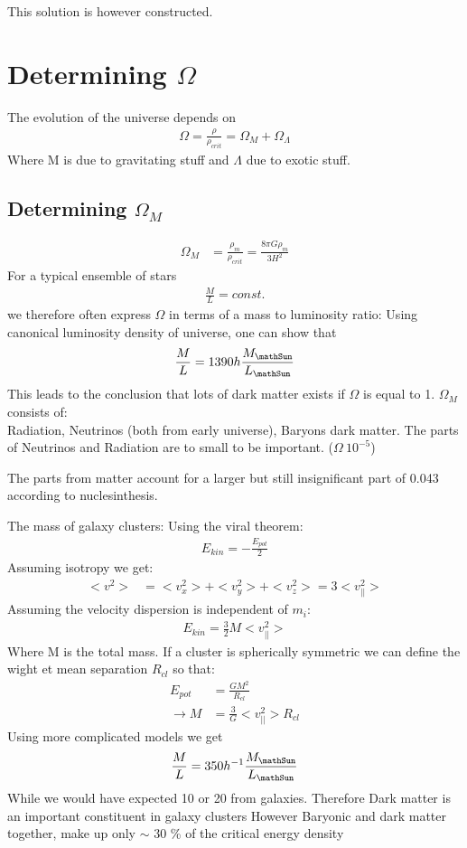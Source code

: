 \documentclass[11pt,a4paper]{article}
\begin{document}
This solution is however constructed.

\section {Determining \texorpdfstring{$\Omega$}{TEXT}}
The evolution of the universe depends on
\begin{align*}
    \Omega = \frac {\rho} {\rho_{crit}} = \Omega_M + \Omega_\Lambda
\end{align*}
Where M is due to gravitating stuff and $\Lambda$ due to exotic stuff.
\subsection{Determining \texorpdfstring{$\Omega_M$}{TEXT}}
\begin{align*}
    \Omega_M &= \frac {\rho_m}{\rho_{crit}} = \frac {8 \pi G \rho_m}{3 H^2}
\end{align*}
For a typical ensemble of stars 
\begin{align*}
   \frac M L = const. 
\end{align*}
we therefore often express $\Omega$ in terms of a mass to luminosity ratio:
Using canonical luminosity density of universe, one can show that
\begin{align*}
    \frac M L = 1390 h \frac {M_{\mathSun}} {L_\mathSun}
\end{align*}
This leads to the conclusion that lots of dark matter exists if $\Omega$ is equal to 1.
$\Omega_M$ consists of: \\
Radiation, Neutrinos (both from early universe), Baryons dark matter. 
The parts of Neutrinos and Radiation are to small to be important. ($\Omega ~ 10^{-5}$)

The parts from matter account for a larger but still insignificant part of 0.043 according to nuclesinthesis.

The mass of galaxy clusters:
Using the viral theorem:
\begin{align*}
    E_{kin}  = - \frac {E_{pot}}{2}
\end{align*}
Assuming isotropy we get: 
\begin{align*}
    <v^2> &=  <v_x^2>+<v_y^2>+<v_z^2> = 3 <v_{||}^2 >
\end{align*}
Assuming the velocity dispersion is independent of $m_i$:
\begin{align*}
    E_{kin} = \frac 3 2 M <v_{||}^2> 
\end{align*}
Where M is the total mass. 
If a cluster is spherically symmetric we can define the wight et mean separation $R_{cl}$ so that:
\begin{align*}
    E_{pot}  &=  \frac {GM^2}{R_{cl}} \\
    \rightarrow M &= \frac 3 G <v^2_{||}> R_{cl}
\end{align*}
Using more complicated models we get
\begin{align*}
    \frac M L = 350 h^{-1} \frac {M_{\mathSun}} {L_\mathSun}
\end{align*}
While we would have expected 10 or 20 from galaxies.
Therefore Dark matter is an important
constituent in galaxy clusters
However Baryonic and dark matter together, make up only $\sim$ 30 \%
of the critical energy density
\end{document}
